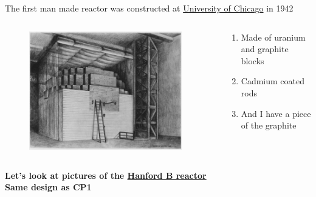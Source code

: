 \documentclass[aspectratio=1610,pdftex,dvipsnames,compress,xcolor={dvipsnames}]{beamer}
\begin{document}
\addtocounter{framenumber}{-2} 
\begin{frame}{The first man made reactor was constructed at \href{https://uidaho.pressbooks.pub/nuclearengineering/chapter/front-end-of-the-fuel-cycle-2/}{University of Chicago} in 1942}
    \begin{columns}[c]

        \begin{column}{0.55\textwidth}
            \begin{figure}
                \centering
                \includegraphics[width=0.95\textwidth]{cp1.jpg}
            \end{figure}
        \end{column}

        \begin{column}{0.45\textwidth}
            \begin{enumerate}[series=outerlist,topsep=0pt,itemsep=21pt,leftmargin=*,label=(\arabic*)]
                \item[]Made of uranium and graphite blocks
                \item[]Cadmium coated rods
                \item[]And I have a piece of the graphite
            \end{enumerate}
        \end{column}

    \end{columns}
\end{frame}


\begin{frame}[plain]{}
    \centering\LARGE\textbf{Let's look at pictures of the \href{https://uidaho.pressbooks.pub/nuclearengineering/chapter/front-end-of-the-fuel-cycle-2/}{Hanford B reactor}}\\
    \centering\large\textbf{Same design as CP1}
\end{frame}
\end{document}
